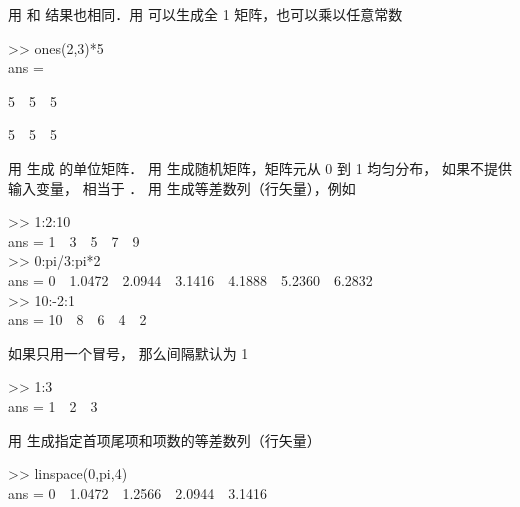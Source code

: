 用  和  结果也相同．用  可以生成全 1 矩阵，也可以乘以任意常数
\begin{Command}
>> ones(2,3)*5 \\
ans = \par
5\ \ 5\ \ 5 \par
5\ \ 5\ \ 5
\end{Command}
用  生成  的单位矩阵． 用  生成随机矩阵，矩阵元从 0 到 1 均匀分布， 如果不提供输入变量，  相当于 ． 用  生成等差数列（行矢量），例如
\begin{Command}
>> 1:2:10 \\
ans = 1\ \ 3\ \ 5\ \ 7\ \ 9 \\
>> 0:pi/3:pi*2 \\
ans = 0\ \ 1.0472\ \ 2.0944\ \ 3.1416\ \ 4.1888\ \ 5.2360\ \ 6.2832 \\
>> 10:-2:1 \\
ans = 10\ \ 8\ \ 6\ \ 4\ \ 2
\end{Command}
如果只用一个冒号， 那么间隔默认为 1
\begin{Command}
>> 1:3 \\
ans = 1\ \ 2\ \ 3
\end{Command}
用  生成指定首项尾项和项数的等差数列（行矢量）
\begin{Command}
>> linspace(0,pi,4) \\
ans = 0\ \ 1.0472\ \ 1.2566\ \ 2.0944\ \ 3.1416
\end{Command}

